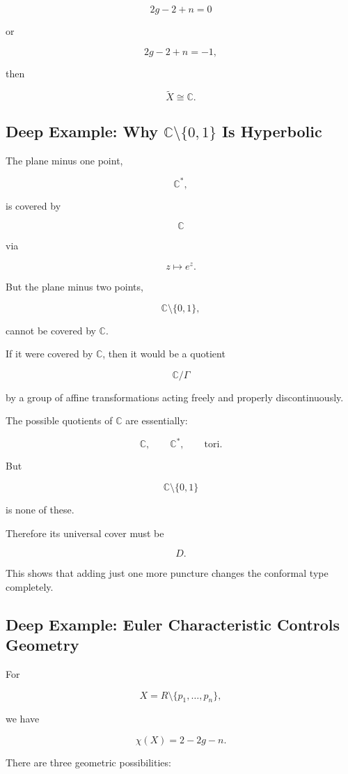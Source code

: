 \documentclass[12pt,a4paper]{article}
\theoremstyle{notespace}
\begin{document}
\[
2g-2+n=0
\]

or

\[
2g-2+n=-1,
\]

then

\[
\widetilde X\cong\mathbb C.
\]

\subsection{Deep Example: Why \(\mathbb C\setminus\{0,1\}\) Is Hyperbolic}

The plane minus one point,

\[
\mathbb C^*,
\]

is covered by

\[
\mathbb C
\]

via

\[
z\mapsto e^z.
\]

But the plane minus two points,

\[
\mathbb C\setminus\{0,1\},
\]

cannot be covered by \(\mathbb C\).

If it were covered by \(\mathbb C\), then it would be a quotient

\[
\mathbb C/\Gamma
\]

by a group of affine transformations acting freely and properly discontinuously.

The possible quotients of \(\mathbb C\) are essentially:

\[
\mathbb C,
\qquad
\mathbb C^*,
\qquad
\text{tori}.
\]

But

\[
\mathbb C\setminus\{0,1\}
\]

is none of these.

Therefore its universal cover must be

\[
D.
\]

This shows that adding just one more puncture changes the conformal type completely.

\subsection{Deep Example: Euler Characteristic Controls Geometry}

For

\[
X=R\setminus\{p_1,\dots,p_n\},
\]

we have

\[
\chi(X)=2-2g-n.
\]

There are three geometric possibilities:
\end{document}
